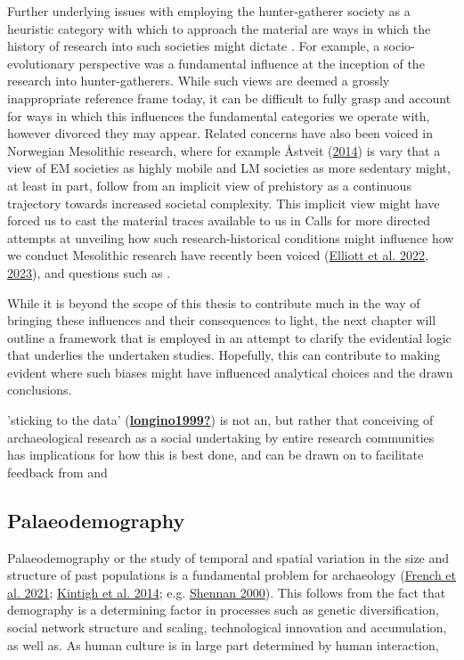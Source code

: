 \documentclass[
  a4paper,
  oneside]{uiophdthesis}
\begin{document}
Further underlying issues with employing the hunter-gatherer society as a heuristic category with which to approach the material are ways in which the history of research into such societies might dictate . For example, a socio-evolutionary perspective was a fundamental influence at the inception of the research into hunter-gatherers. While such views are deemed a grossly inappropriate reference frame today, it can be difficult to fully grasp and account for ways in which this influences the fundamental categories we operate with, however divorced they may appear. Related concerns have also been voiced in Norwegian Mesolithic research, where for example Åstveit (\protect\hyperlink{ref-uxe5stveit2014}{2014}) is vary that a view of EM societies as highly mobile and LM societies as more sedentary might, at least in part, follow from an implicit view of prehistory as a continuous trajectory towards increased societal complexity. This implicit view might have forced us to cast the material traces available to us in Calls for more directed attempts at unveiling how such research-historical conditions might influence how we conduct Mesolithic research have recently been voiced (\protect\hyperlink{ref-elliott2022}{Elliott et al. 2022}, \protect\hyperlink{ref-elliott2023}{2023}), and questions such as .

While it is beyond the scope of this thesis to contribute much in the way of bringing these influences and their consequences to light, the next chapter will outline a framework that is employed in an attempt to clarify the evidential logic that underlies the undertaken studies. Hopefully, this can contribute to making evident where such biases might have influenced analytical choices and the drawn conclusions.

'sticking to the data' (\protect\hyperlink{ref-longino1999}{\textbf{longino1999?}}) is not an, but rather that conceiving of archaeological research as a social undertaking by entire research communities has implications for how this is best done, and can be drawn on to facilitate feedback from and

\hypertarget{palaeodemography}{%
\subsection{Palaeodemography}\label{palaeodemography}}

Palaeodemography or the study of temporal and spatial variation in the size and structure of past populations is a fundamental problem for archaeology (\protect\hyperlink{ref-french2021}{French et al. 2021}; \protect\hyperlink{ref-kintigh2014}{Kintigh et al. 2014}; e.g. \protect\hyperlink{ref-shennan2000}{Shennan 2000}). This follows from the fact that demography is a determining factor in processes such as genetic diversification, social network structure and scaling, technological innovation and accumulation, as well as. As human culture is in large part determined by human interaction,
\end{document}
